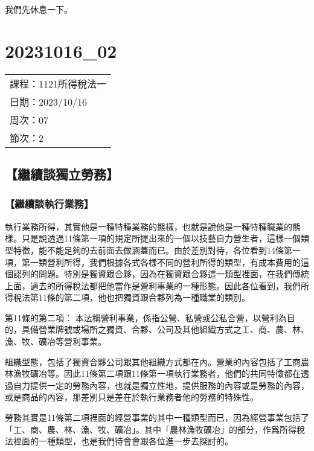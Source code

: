 \documentclass[]{ctexbook}
\begin{document}
我們先休息一下。

\hypertarget{section-12}{%
\chapter{20231016\_02}\label{section-12}}

\begin{longtable}[]{@{}l@{}}
\toprule()
\endhead
課程：1121所得稅法一 \\
日期：2023/10/16 \\
周次：07 \\
節次：2 \\
\bottomrule()
\end{longtable}

\hypertarget{ux7e7cux7e8cux8ac7ux7368ux7acbux52deux52d9}{%
\section{【繼續談獨立勞務】}\label{ux7e7cux7e8cux8ac7ux7368ux7acbux52deux52d9}}

\hypertarget{ux7e7cux7e8cux8ac7ux57f7ux884cux696dux52d9}{%
\subsection{【繼續談執行業務】}\label{ux7e7cux7e8cux8ac7ux57f7ux884cux696dux52d9}}

執行業務所得，其實他是一種特種業務的態樣，也就是說他是一種特種職業的態樣。只是說透過11條第一項的規定所提出來的一個以技藝自力營生者，這樣一個類型特徵，能不能足夠的去前面去做涵蓋而已。由於差別對待，各位看到14條第一項，第一類營利所得，我們根據各式各樣不同的營利所得的類型，有成本費用的這個認列的問題。特別是獨資跟合夥，因為在獨資跟合夥這一類型裡面，在我們傳統上面，過去的所得稅法都把他當作是營利事業的一種形態。因此各位看到，我們所得稅法第11條的第二項，他也把獨資跟合夥列為一種職業的類別。

第11條的第二項：
本法稱營利事業，係指公營、私營或公私合營，以營利為目的，具備營業牌號或場所之獨資、合夥、公司及其他組織方式之工、商、農、林、漁、牧、礦冶等營利事業。

組織型態，包括了獨資合夥公司跟其他組織方式都在內。營業的內容包括了工商農林漁牧礦冶等。因此11條第二項跟11條第一項執行業務者，他們的共同特徵都在透過自力提供一定的勞務內容，也就是獨立性地，提供服務的內容或是勞務的內容，或是商品的內容，那差別只是差在於執行業務者他的勞務的特殊性。

勞務其實是11條第二項裡面的經營事業的其中一種類型而已，因為經營事業包括了「工、商、農、林、漁、牧、礦冶」。其中「農林漁牧礦冶」的部分，作爲所得稅法裡面的一種類型，也是我們待會會跟各位進一步去探討的。
\end{document}
